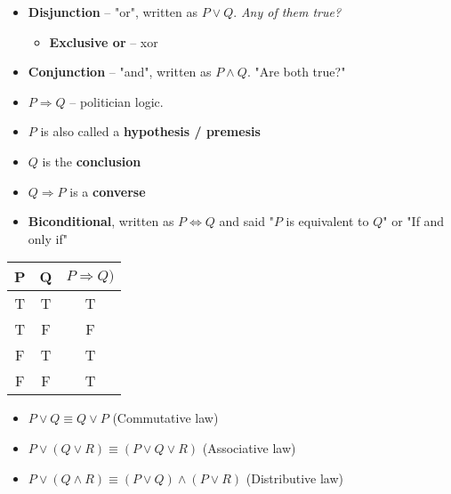 \documentclass[english,10pt,a4paper]{article}
\begin{document}
\begin{theo} 
\begin{itemize}
\item \textbf{Disjunction} -- "or", written as $P \vee Q$. \textit{Any of them true?}
\begin{itemize}
\item \textbf{Exclusive or} -- xor
\end{itemize}
\item \textbf{Conjunction} -- "and", written as $P\wedge Q$. "Are both true?"
\end{itemize}
\end{theo}

\begin{theo}

\begin{minipage}{0.6\linewidth} 
\begin{itemize}
\item $P \Rightarrow Q$ -- politician logic.
\item $P$ is also called a \textbf{hypothesis / premesis}
\item $Q$ is the \textbf{conclusion}
\item $Q \Rightarrow P$ is a \textbf{converse}
\item \textbf{Biconditional}, written as $P \Leftrightarrow Q$ and said "$P$ is equivalent to $Q$" or "If and only if"
\end{itemize}
\end{minipage}
\hspace{0.1cm}
\begin{minipage}{0.3\linewidth}

\begin{tabular}{cc|c}
P & Q & $P \Rightarrow Q)$\\ 
\hline
T & T & T \\ 
T & F & F \\
F & T & T \\
F & F & T
\end{tabular} 
\end{minipage}
\end{theo}

\begin{theo} 
\begin{itemize}
\item $ P \vee Q \equiv Q \vee P$ (Commutative law)
\item $P \vee (Q \vee R) \equiv (P \vee Q \vee R)$ (Associative law)
\item $P\vee (Q \wedge R) \equiv (P \vee Q) \wedge (P \vee R) $ (Distributive law)
\end{itemize}
\end{theo}
\end{document}
